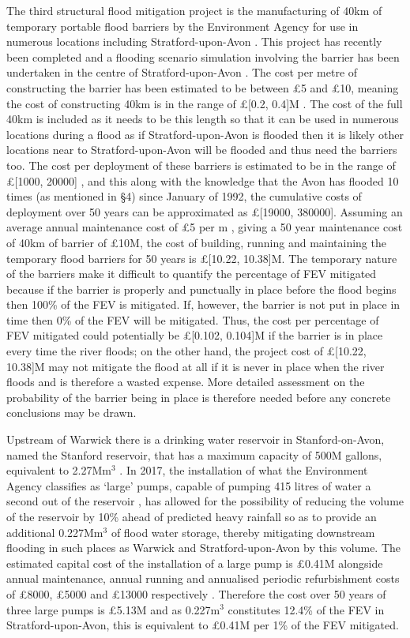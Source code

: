 \documentclass[11pt,a4paper]{article}
\begin{document}
The third structural flood mitigation project is the manufacturing of 40km of temporary portable flood barriers by the Environment Agency for use in numerous locations including Stratford-upon-Avon \cite{lentemp}. This project has recently been completed and a flooding scenario simulation involving the barrier has been undertaken in the centre of Stratford-upon-Avon \cite{strat-flood}. The cost per metre of constructing the barrier has been estimated to be between \pounds5 and \pounds10, meaning the cost of constructing 40km is in the range of \pounds[0.2, 0.4]M \cite{temp}. The cost of the full 40km is included as it needs to be this length so that it can be used in numerous locations during a flood as if Stratford-upon-Avon is flooded then it is likely other locations near to Stratford-upon-Avon will be flooded and thus need the barriers too. The cost per deployment of these barriers is estimated to be in the range of \pounds[1000, 20000] \cite{temp}, and this along with the knowledge that the Avon has flooded 10 times (as mentioned in \S 4) since January of 1992, the cumulative costs of deployment over 50 years can be approximated as \pounds[19000, 380000]. Assuming an average annual maintenance cost of \pounds5 per m \cite{cost1}, giving a 50 year maintenance cost of 40km of barrier of \pounds10M, the cost of building, running and maintaining the temporary flood barriers for 50 years is \pounds[10.22, 10.38]M. The temporary nature of the barriers make it difficult to quantify the percentage of FEV mitigated because if the barrier is properly and punctually in place before the flood begins then 100\% of the FEV is mitigated. If, however, the barrier is not put in place in time then 0\% of the FEV will be mitigated. Thus, the cost per percentage of FEV mitigated could potentially be \pounds[0.102, 0.104]M if the barrier is in place every time the river floods{;} on the other hand, the project cost of \pounds[10.22, 10.38]M may not mitigate the flood at all if it is never in place when the river floods and is therefore a wasted expense. More detailed assessment on the probability of the barrier being in place is therefore needed before any concrete conclusions may be drawn.

Upstream of Warwick there is a drinking water reservoir in Stanford-on-Avon, named the Stanford reservoir, that has a maximum capacity of 500M gallons, equivalent to 2.27Mm$^3$ \cite{volume}. In 2017, the installation of what the Environment Agency classifies as `large' pumps, capable of pumping 415 litres of water a second out of the reservoir \cite{pump}, has allowed for the possibility of reducing the volume of the reservoir by 10\% ahead of predicted heavy rainfall so as to provide an additional 0.227Mm$^3$ of flood water storage, thereby mitigating downstream flooding in such places as Warwick and Stratford-upon-Avon by this volume. The estimated capital cost of the installation of a large pump is \pounds0.41M alongside annual maintenance, annual running and annualised periodic refurbishment costs of \pounds8000, \pounds5000 and \pounds13000 respectively \cite{cost2}. Therefore the cost over 50 years of three large pumps is \pounds5.13M and as 0.227m$^3$ constitutes 12.4\% of the FEV in Stratford-upon-Avon, this is equivalent to \pounds0.41M per 1\% of the FEV mitigated.
\end{document}
